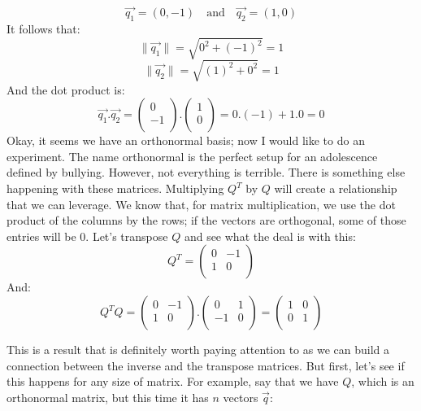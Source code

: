 \documentclass[a4,12pt,twosided,openany]{memoir}
\begin{document}
\[\overrightarrow{q_1} = (0, -1) \quad \textrm{and}  \quad\overrightarrow{q_2} = (1,0)\]
It follows that: 
\[ \lVert \overrightarrow{q_1} \rVert = \sqrt{0^2 + (-1)^2} = 1\]
\[ \lVert \overrightarrow{q_2} \rVert = \sqrt{(1)^2 + 0^2}  = 1 \]
And the dot product is:
\[\overrightarrow{q_1}.\overrightarrow{q_2} = \begin{pmatrix}
0 \\
-1\\
\end{pmatrix}.\begin{pmatrix}
1\\
0\\
\end{pmatrix} =0.(-1) + 1.0 = 0 \]
\indent
Okay, it seems we have an orthonormal basis; now I would like to do an experiment. The name orthonormal is the perfect setup for an adolescence defined by bullying. However, not everything is terrible. There is something else happening with these matrices. Multiplying $Q^T$ by $Q$ will create a relationship that we can leverage. We know that, for matrix multiplication, we use the dot product of the columns by the rows; if the vectors are orthogonal, some of those entries will be 0. Let’s transpose $Q$ and see what the deal is with this:
\[Q^T = \begin{pmatrix}
0 & -1 \\
1 & 0 \\
\end{pmatrix}
\]
And:
\[Q^TQ = \begin{pmatrix}
0 & -1 \\
1 & 0 \\
\end{pmatrix}.\begin{pmatrix}
0 & 1 \\
-1 & 0 \\
\end{pmatrix} = \begin{pmatrix}
1 & 0 \\
0 & 1 \\
\end{pmatrix} \]
\par 
\indent
This is a result that is definitely worth paying attention to as we can build a connection between the inverse and the transpose matrices. But first, let’s see if this happens for any size of matrix. For example, say that we have $Q$, which is an orthonormal matrix, but this time it has $n$ vectors $\overrightarrow{q}$:
\newcommand*{\vertbar}{\rule[-1ex]{0.5pt}{2.5ex}}
\newcommand*{\horzbar}{\rule[.5ex]{2.5ex}{0.5pt}}
\end{document}
